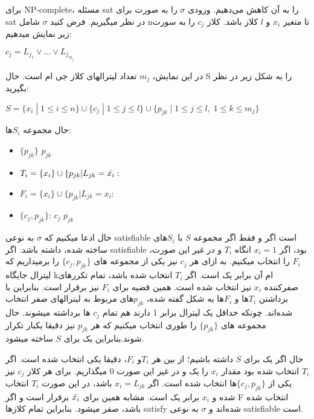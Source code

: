 برای NP-complete،
مسئله sat را به آن کاهش می‌دهیم.
ورودی $\sigma$ را به صورت 
برای sat در نظر میگیریم.
فرض کنید $\sigma$ شامل nتا متغیر 
$x_i$ و $l$ کلاز باشد.
کلاز
$c_j$ را به سورت زیر نمایش میدهیم:
\begin{center}
    $c_j = L_{j_1} \vee \ldots \vee L_{j_{m_j}}$
\end{center}
در این نمایش،
$m_j$ تعداد لیترالهای کلاز جی ام است.
حال S را به شکل زیر در نظر بگیرید:
\begin{center}
    $S = \{x_i\;|\; 1 \leq i \leq n\} \cup \{c_j\;|\;1\leq j\leq l\}\cup \{p_{jk}\;|\;1\leq j \leq l,\; 1 \leq k \leq m_j \}$
\end{center}
حال مجموعه $S_i$ها:
\begin{itemize}
    \item $\{p_{jk}\}$  $p_{jk}$\\
    \item $T_i = \{x_i\} \cup \{p_{jk} | L_{jk} = \Bar{x_i}:$
    \item $F_i = \{x_i\} \cup \{p_{jk} | L_{jk} = x_i:$
    \item $\{c_j, p_{jk}\}$:  $c_j$  $p_{jk}$
\end{itemize}
حال ادعا میکنیم که $\sigma$ به نوعی satisfiable است اگر و فقط اگر 
مجموعه $S$ با $S_i$های ساخته شده،
 داشته باشد.
اگر satisfiable بود،
اگر 
$x_i = 1$ انگاه $T_i$ و در غیر این صورت،
$F_i$ را انتخاب میکنیم.
به ازای هر $c_j$ نیز یکی از مجموعه های 
$\{c_j,p_{jk}\}$ را برمیداریم که لیترال جایگاه kام آن برابر یک است.
اگر $T_i$ انتخاب شده باشد، تمام تکررهای صفرکننده $x_i$ نیز انتخاب شده است.
همین قضیه برای $F_i$ نیز برقرار است.
بنابراین با برداشتن $T_i$ها و $F_i$ها به شکل گفته شده،
$p_{jk}$های مربوط به  لیترالهای صفر انتخاب شده‌اند.
چونکه حداقل یک لیترال برابر 1 دارند هم تمام $c_j$ ها برداشته میشوند.
حال مجموعه های
$\{p_{jk}\}$
را طوری انتخاب میکنیم که هر
$p_{jk}$
نیز دقیقا یکبار تکرار شوند.بنابراین یک 
 برای $S$ ساخته میشود.

حال اگر یک 
برای $S$ داشته باشیم؛
از بین هر 
$T_i$و $F_i$،
دقیقا یکی انتخاب شده است.
اگر 
$T_i$ انتخاب شده بود مقدار $x_i$ را یک و در غیر این صورت 0 میگذاریم.
برای هر کلاز $c_j$ نیز یکی از 
$\{c_j, p_{jk}\}$ها انتخاب شده است.
اگر 
$x_i = L_{jk}$
باشد، در این صورت 
$T_i$ انتخاب شده و $x_i$ برابر یک است. مشابه همین برای
$\Bar{x_i}$ برقرار است و اگر F انتخاب شده باشد، صفر میشود.
بنابراین تمام کلازها satisfy شده‌اند و $\sigma$ به نوعی satisfiable است.

